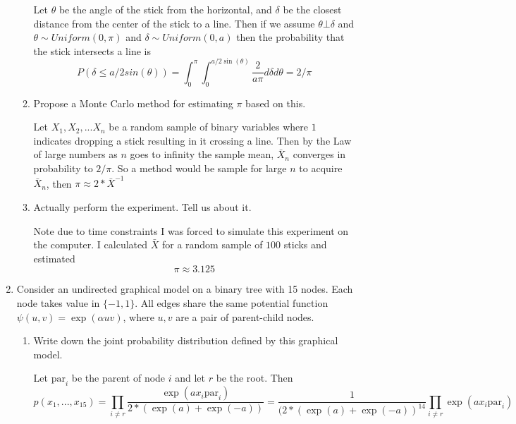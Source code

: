 \documentclass{article}
\begin{document}
\begin{enumerate}
\begin{enumerate}
\color{blue}
Let $\theta$ be the angle of the stick from the horizontal, and $\delta$ be the closest distance from the center of the stick to a line. Then
if we assume $\theta \bot \delta$ and $\theta \sim Uniform(0,\pi) $ and $\delta \sim Uniform(0,a)$ then the probability that the stick intersects a line is
$$
P(\delta \leq a /2 sin(\theta)) = \int_0^\pi \int_0^{a/2\sin(\theta)} \frac{2}{a\pi} d \delta d\theta = 2/\pi
$$

\color{black}

\item Propose a Monte Carlo method for estimating $\pi$ based on this. 

\color{blue}
Let $X_1, X_2 , ... X_n$ be a random sample of binary variables where $1$ indicates dropping a stick resulting in it crossing a line. Then by the Law of large numbers as $n$ goes to infinity the sample mean, $\bar{X}_n$ converges in probability to $2/\pi$. So a method would be sample for large $n$ to acquire $\bar{X}_n$, 
then $\pi \approx 2 * \bar{X}^{-1} $
\color{black}

\item Actually perform the experiment.  Tell us about it.

\color{blue}
Note due to time constraints I was forced to simulate this experiment on the computer. I calculated $\bar{X}$ for a random sample of $100$ sticks and estimated 
$$
\pi \approx 3.125
$$

\color{black}


\end{enumerate}

\item 
Consider an undirected graphical model on a binary tree with 15 nodes.
Each node takes value in $\{-1,1\}$.
All edges share the same potential function $\psi(u,v) = \exp(\alpha u v)$, where $u,v$ are a pair of parent-child nodes.

  \begin{enumerate}
  \item Write down the joint probability distribution defined by this graphical model.

\color{blue}
Let $\text{par}_i$ be the parent of node $i$ and let $r$ be the root.
Then
$$
p(x_1,..., x_{15}) 
= \prod_{i \neq r} 
\frac{\exp (a x_i \text{par}_i)}{2*(\exp(a) + \exp(-a))} = \frac{1}{(2*(\exp(a) + \exp(-a))^{14}}  \prod_{i \neq r} 
\exp (a x_i \text{par}_i)
$$

\color{black}  
  
  
  

\end{enumerate}
\end{enumerate}
\end{document}
